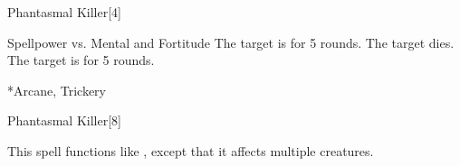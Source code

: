 \begin{spellsection}{Phantasmal Killer}[4]
    \begin{spellheader}
    \end{spellheader}
    \begin{spellcontent}
        \begin{spelltargetinginfo}
        \end{spelltargetinginfo}
        \begin{spelleffects}
            \begin{spellattack}{Spellpower vs. Mental and Fortitude}
                \spellsuccess[Mental] The target is \frightened for 5 rounds.
                 The target dies.
                \spellfailure The target is \shaken for 5 rounds.
            \end{spellattack}
        \end{spelleffects}
    \end{spellcontent}
    \begin{spellfooter}
        *{Arcane, Trickery}
        \miscastrandom
    \end{spellfooter}
\end{spellsection}

\begin{spellsection}[Mass]{Phantasmal Killer}[8]
    \begin{spellheader}
    \end{spellheader}
    \begin{spellcontent}
        \begin{spelltargetinginfo}
        \end{spelltargetinginfo}
        \begin{spelleffects}
            \spellspecial This spell functions like , except that it affects multiple creatures.
        \end{spelleffects}
    \end{spellcontent}
    \begin{spellfooter}
        \miscastexplode
    \end{spellfooter}
\end{spellsection}


